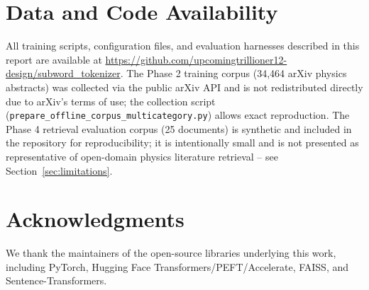 \documentclass[11pt]{article}
\begin{document}
\section*{Data and Code Availability}

All training scripts, configuration files, and evaluation harnesses
described in this report are available at
\url{https://github.com/upcomingtrillioner12-design/subword_tokenizer}.
The Phase 2 training corpus (34{,}464 arXiv physics abstracts) was
collected via the public arXiv API and is not redistributed directly due
to arXiv's terms of use; the collection script
(\texttt{prepare\_offline\_corpus\_multicategory.py}) allows exact
reproduction. The Phase 4 retrieval evaluation corpus (25 documents) is
synthetic and included in the repository for reproducibility; it is
intentionally small and is not presented as representative of open-domain
physics literature retrieval -- see Section~\ref{sec:limitations}.

\section*{Acknowledgments}
We thank the maintainers of the open-source libraries underlying this work,
including PyTorch, Hugging Face Transformers/PEFT/Accelerate, FAISS, and
Sentence-Transformers.
\end{document}
